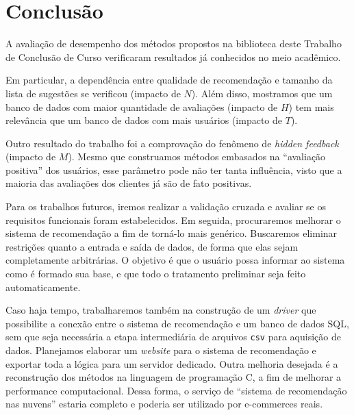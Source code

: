 \chapter{Conclusão}
\label{cha:trabalhos_futuros}

A avaliação de desempenho dos métodos propostos na biblioteca deste Trabalho de Conclusão de Curso verificaram resultados já conhecidos no meio acadêmico.

Em particular, a dependência entre qualidade de recomendação e tamanho da lista de sugestões se verificou (impacto de $N$). Além disso, mostramos que um banco de dados com maior quantidade de avaliações (impacto de $H$) tem mais relevância que um banco de dados com mais usuários (impacto de $T$). 

Outro resultado do trabalho foi a comprovação do fenômeno de \textit{hidden feedback} (impacto de $M$). Mesmo que construamos métodos embasados na ``avaliação positiva'' dos usuários, esse parâmetro pode não ter tanta influência, visto que a maioria das avaliações dos clientes já são de fato positivas.

Para os trabalhos futuros, iremos realizar a validação cruzada e avaliar se os requisitos funcionais foram estabelecidos. Em seguida, procuraremos melhorar o sistema de recomendação a fim de torná-lo mais genérico. Buscaremos eliminar restrições quanto a entrada e saída de dados, de forma que elas sejam completamente arbitrárias. O objetivo é que o usuário possa informar ao sistema como é formado sua base, e que todo o tratamento preliminar seja feito automaticamente. 

Caso haja tempo, trabalharemos também na construção de um \textit{driver} que possibilite a conexão entre o sistema de recomendação e um banco de dados SQL, sem que seja necessária a etapa intermediária de arquivos \texttt{csv} para aquisição de dados. Planejamos elaborar um \textit{website} para o sistema de recomendação e exportar toda a lógica para um servidor dedicado. Outra melhoria desejada é a reconstrução dos métodos na linguagem de programação C, a fim de melhorar a performance computacional. Dessa forma, o serviço de ``sistema de recomendação nas nuvens'' estaria completo e poderia ser utilizado por e-commerces reais.